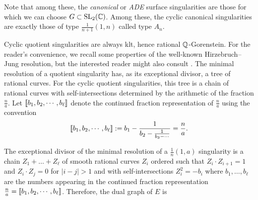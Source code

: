 \documentclass[main.tex]{subfiles}
\begin{document}
\begin{rmk}
Note that among these, the \textit{canonical} or \textit{ADE} surface singularities are those for which we can choose $G \subset \mathrm{SL}_2(\mathbb{C})$. Among these, the cyclic canonical singularities are exactly those of type $\frac{1}{n+1}(1,n)$ called type $A_n$.
\end{rmk}

Cyclic quotient singularities are always klt, hence rational $\mathbb{Q}$-Gorenstein. For the reader's convenience, we recall some properties of the well-known Hirzebruch--Jung resolution, but the interested reader might also consult \cite[\S2.6]{Fulton:toric_varieties}.
The minimal resolution of a quotient singularity has, as its exceptional divisor, a tree of rational curves. For the cyclic quotient singularities, this tree is a chain of rational curves with self-intersections determined by the arithmetic of the fraction $\frac{n}{a}$. Let $\llbracket b_1, b_2, \cdots, b_{\ell} \rrbracket$ denote the continued fraction representation of $\frac{n}{a}$ using the convention
\[ \llbracket b_1, b_2, \cdots, b_{\ell} \rrbracket := b_1 - \frac{1}{b_2 - \frac{1}{b_3 - \cdots}} = \frac{n}{a}. \]

\begin{prop}
The exceptional divisor of the minimal resolution of a $\frac{1}{n} (1,a)$ singularity is a chain $Z_1 +  \dots + Z_{\ell}$ of smooth rational curves $Z_i$ ordered such that $Z_i \cdot Z_{i+1} = 1$ and $Z_i \cdot Z_j = 0$ for $|i - j| > 1$ and with self-intersections $Z_i^2 = -b_i$ where $b_1, \dots, b_{\ell}$ are the numbers appearing in the continued fraction representation $\frac{n}{a} = \llbracket b_1, b_2, \cdots, b_{\ell} \rrbracket$. Therefore, the dual graph of $E$ is \begin{center}
\end{center}
\end{prop}
\end{document}
